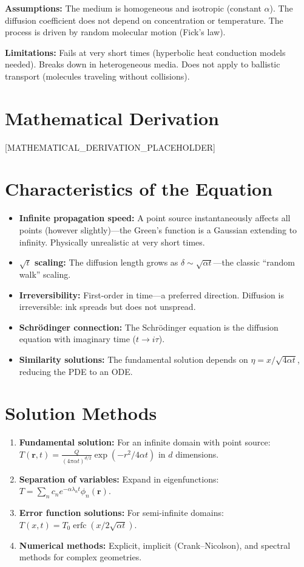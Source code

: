 \documentclass[11pt,openright]{book}
\begin{document}
\textbf{Assumptions:} The medium is homogeneous and isotropic (constant $\alpha$). The diffusion coefficient does not depend on concentration or temperature. The process is driven by random molecular motion (Fick's law).


\textbf{Limitations:} Fails at very short times (hyperbolic heat conduction models needed). Breaks down in heterogeneous media. Does not apply to ballistic transport (molecules traveling without collisions).


\section*{Mathematical Derivation}

[MATHEMATICAL_DERIVATION_PLACEHOLDER]

\section*{Characteristics of the Equation}

\begin{itemize}
\item \textbf{Infinite propagation speed:} A point source instantaneously affects all points (however slightly)---the Green's function is a Gaussian extending to infinity. Physically unrealistic at very short times.
\item \textbf{$\sqrt{t}$ scaling:} The diffusion length grows as $\delta \sim \sqrt{\alpha t}$---the classic ``random walk'' scaling.
\item \textbf{Irreversibility:} First-order in time---a preferred direction. Diffusion is irreversible: ink spreads but does not unspread.
\item \textbf{Schr\"odinger connection:} The Schr\"odinger equation is the diffusion equation with imaginary time ($t \to i\tau$).
\item \textbf{Similarity solutions:} The fundamental solution depends on $\eta = x/\sqrt{4\alpha t}$, reducing the PDE to an ODE.
\end{itemize}
\section*{Solution Methods}

\begin{enumerate}
\item \textbf{Fundamental solution:} For an infinite domain with point source: $T(\mathbf{r}, t) = \frac{Q}{(4\pi \alpha t)^{d/2}} \exp(-r^2 / 4\alpha t)$ in $d$ dimensions.
\item \textbf{Separation of variables:} Expand in eigenfunctions: $T = \sum_n c_n e^{-\alpha \lambda_n t} \phi_n(\mathbf{r})$.
\item \textbf{Error function solutions:} For semi-infinite domains: $T(x, t) = T_0 \operatorname{erfc}(x / 2\sqrt{\alpha t})$.
\item \textbf{Numerical methods:} Explicit, implicit (Crank--Nicolson), and spectral methods for complex geometries.
\end{enumerate}
\end{document}
